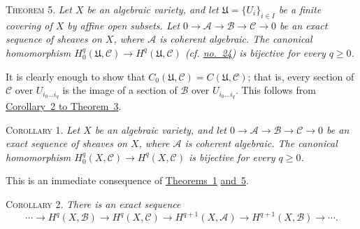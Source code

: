 \label{fac:II:3:thm:5}
\textsc{Theorem 5.} \textit{Let $X$ be an algebraic variety, and let
$\mathfrak{U}=\{U_i\}_{i\in I}$ be a finite covering of $X$ by affine open
subsets. Let
$0\to\mathcal{A}\to\mathcal{B}\to\mathcal{C}\to0$ be an exact sequence of
sheaves on $X$, where $\mathcal{A}$ is coherent algebraic. The canonical
homomorphism
$H_0^q(\mathfrak{U},\mathcal{C})\to H^q(\mathfrak{U},\mathcal{C})$
(cf. \hyperref[fac:I:3:no:24]{no.~24}) is bijective for every $q\geq0$.}

It is clearly enough to show that
$C_0(\mathfrak{U},\mathcal{C})=C(\mathfrak{U},\mathcal{C})$; that is, every
section of $\mathcal{C}$ over $U_{i_0\ldots i_q}$ is the image of a section
of $\mathcal{B}$ over $U_{i_0\ldots i_q}$. This follows from \hyperref[fac:II:3:no:46:thm:3:cor:2]{Corollary~2 to
Theorem~3}.

\label{fac:II:3:thm:5:cor:1}
\textsc{Corollary 1.} \textit{Let $X$ be an algebraic variety, and let
$0\to\mathcal{A}\to\mathcal{B}\to\mathcal{C}\to0$ be an exact sequence of
sheaves on $X$, where $\mathcal{A}$ is coherent algebraic. The canonical
homomorphism $H_0^q(X,\mathcal{C})\to H^q(X,\mathcal{C})$ is bijective for
every $q\geq0$.}

This is an immediate consequence of \hyperref[fac:II:3:no:42:thm:1]{Theorems~1} \hyperref[fac:II:3:thm:5]{and~5}.

\label{fac:II:3:thm:5:cor:2}
\textsc{Corollary 2.} \textit{There is an exact sequence}
\[
\cdots\longrightarrow H^q(X,\mathcal{B})
\longrightarrow H^q(X,\mathcal{C})
\longrightarrow H^{q+1}(X,\mathcal{A})
\longrightarrow H^{q+1}(X,\mathcal{B})
\longrightarrow\cdots .
\]
